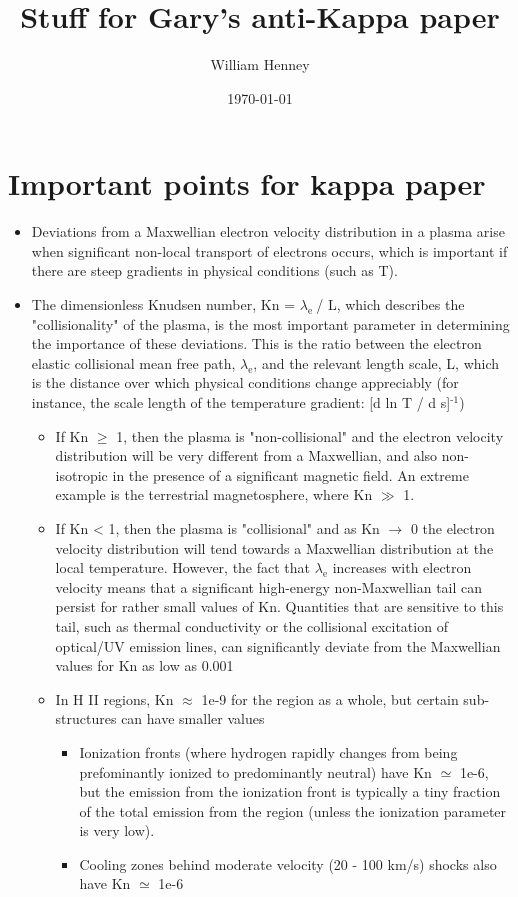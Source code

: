 \documentclass[11pt]{article}
\author{William Henney}
\date{\today}
\title{Stuff for Gary's anti-Kappa paper}
\begin{document}
\maketitle
\tableofcontents

\section{Important points for kappa paper}
\label{sec:orgheadline1}
\begin{itemize}
\item Deviations from a Maxwellian electron velocity distribution in a plasma arise when significant non-local transport of electrons occurs, which is important if there are steep gradients in physical conditions (such as T).
\item The dimensionless Knudsen number, Kn = \(\lambda_{\text{e }}\)/ L, which describes the "collisionality" of the plasma, is the most important parameter in determining the importance of these deviations.  This is the ratio between the electron elastic collisional mean free path, \(\lambda_{\text{e}}\), and the relevant length scale, L, which is the distance over which physical conditions change appreciably (for instance, the scale length of the temperature gradient: [d ln T / d s]\(^{\text{-1}}\))
\begin{itemize}
\item If Kn \(\ge\) 1, then the plasma is "non-collisional" and the electron velocity distribution will be very different from a Maxwellian, and also non-isotropic in the presence of a significant magnetic field.  An extreme example is the terrestrial magnetosphere, where Kn \(\gg\) 1.
\item If Kn < 1, then the plasma is "collisional" and as Kn \(\to\) 0 the electron velocity distribution will tend towards a Maxwellian distribution at the local temperature.  However, the fact that \(\lambda_{\text{e}}\) increases with electron velocity means that a significant high-energy non-Maxwellian tail can persist for rather small values of Kn.  Quantities that are sensitive to this tail, such as thermal conductivity or the collisional excitation of optical/UV emission lines, can significantly deviate from the Maxwellian values for Kn as low as 0.001
\item In H II regions, Kn \(\approx\) 1e-9 for the region as a whole, but certain sub-structures can have smaller values
\begin{itemize}
\item Ionization fronts (where hydrogen rapidly changes from being prefominantly ionized to predominantly neutral) have Kn \(\simeq\) 1e-6, but the emission from the ionization front is typically a tiny fraction of the total emission from the region (unless the ionization parameter is very low).
\item Cooling zones behind moderate velocity (20 - 100 km/s) shocks also have Kn \(\simeq\) 1e-6
\end{itemize}
\end{itemize}
\end{itemize}
\end{document}
